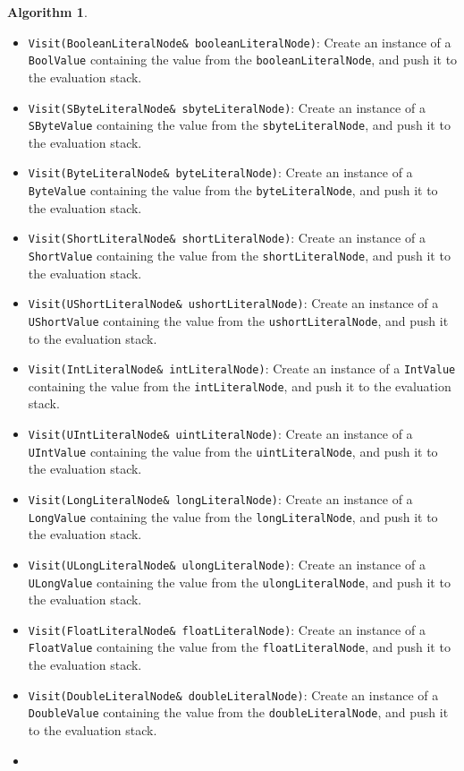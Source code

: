 \documentclass[a4paper,oneside,11pt]{book}
\theoremstyle{definition}
\newtheorem{algo}{Algorithm}[section]
\begin{document}
\begin{algo}
\begin{itemize}
\item
\verb|Visit(BooleanLiteralNode& booleanLiteralNode)|:
Create an instance of a \verb|BoolValue| containing the value from the \verb|booleanLiteralNode|, and push it to the evaluation stack.
\item
\verb|Visit(SByteLiteralNode& sbyteLiteralNode)|:
Create an instance of a \verb|SByteValue| containing the value from the \verb|sbyteLiteralNode|, and push it to the evaluation stack.
\item
\verb|Visit(ByteLiteralNode& byteLiteralNode)|:
Create an instance of a \verb|ByteValue| containing the value from the \verb|byteLiteralNode|, and push it to the evaluation stack.
\item
\verb|Visit(ShortLiteralNode& shortLiteralNode)|:
Create an instance of a \verb|ShortValue| containing the value from the \verb|shortLiteralNode|, and push it to the evaluation stack.
\item
\verb|Visit(UShortLiteralNode& ushortLiteralNode)|:
Create an instance of a \verb|UShortValue| containing the value from the \verb|ushortLiteralNode|, and push it to the evaluation stack.
\item
\verb|Visit(IntLiteralNode& intLiteralNode)|:
Create an instance of a \verb|IntValue| containing the value from the \verb|intLiteralNode|, and push it to the evaluation stack.
\item
\verb|Visit(UIntLiteralNode& uintLiteralNode)|:
Create an instance of a \verb|UIntValue| containing the value from the \verb|uintLiteralNode|, and push it to the evaluation stack.
\item
\verb|Visit(LongLiteralNode& longLiteralNode)|:
Create an instance of a \verb|LongValue| containing the value from the \verb|longLiteralNode|, and push it to the evaluation stack.
\item
\verb|Visit(ULongLiteralNode& ulongLiteralNode)|:
Create an instance of a \verb|ULongValue| containing the value from the \verb|ulongLiteralNode|, and push it to the evaluation stack.
\item
\verb|Visit(FloatLiteralNode& floatLiteralNode)|:
Create an instance of a \verb|FloatValue| containing the value from the \verb|floatLiteralNode|, and push it to the evaluation stack.
\item
\verb|Visit(DoubleLiteralNode& doubleLiteralNode)|:
Create an instance of a \verb|DoubleValue| containing the value from the \verb|doubleLiteralNode|, and push it to the evaluation stack.
\item

\end{itemize}
\end{algo}
\end{document}
